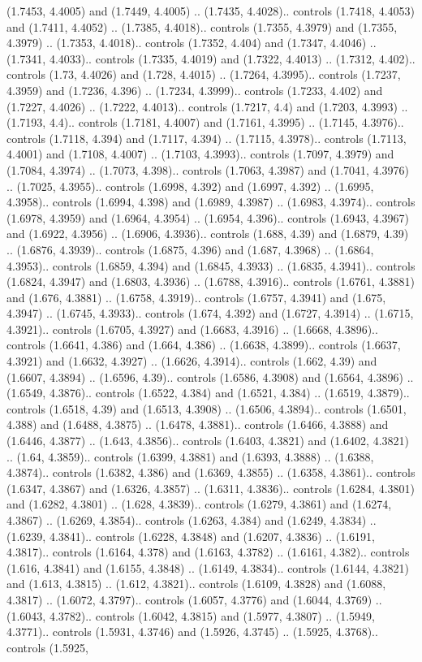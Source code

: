 (1.7453, 4.4005) and (1.7449, 4.4005) .. (1.7435, 4.4028).. controls (1.7418, 4.4053) and (1.7411, 4.4052) .. (1.7385, 4.4018).. controls (1.7355, 4.3979) and (1.7355, 4.3979) .. (1.7353, 4.4018).. controls (1.7352, 4.404) and (1.7347, 4.4046) .. (1.7341, 4.4033).. controls (1.7335, 4.4019) and (1.7322, 4.4013) .. (1.7312, 4.402).. controls (1.73, 4.4026) and (1.728, 4.4015) .. (1.7264, 4.3995).. controls (1.7237, 4.3959) and (1.7236, 4.396) .. (1.7234, 4.3999).. controls (1.7233, 4.402) and (1.7227, 4.4026) .. (1.7222, 4.4013).. controls (1.7217, 4.4) and (1.7203, 4.3993) .. (1.7193, 4.4).. controls (1.7181, 4.4007) and (1.7161, 4.3995) .. (1.7145, 4.3976).. controls (1.7118, 4.394) and (1.7117, 4.394) .. (1.7115, 4.3978).. controls (1.7113, 4.4001) and (1.7108, 4.4007) .. (1.7103, 4.3993).. controls (1.7097, 4.3979) and (1.7084, 4.3974) .. (1.7073, 4.398).. controls (1.7063, 4.3987) and (1.7041, 4.3976) .. (1.7025, 4.3955).. controls (1.6998, 4.392) and (1.6997, 4.392) .. (1.6995, 4.3958).. controls (1.6994, 4.398) and (1.6989, 4.3987) .. (1.6983, 4.3974).. controls (1.6978, 4.3959) and (1.6964, 4.3954) .. (1.6954, 4.396).. controls (1.6943, 4.3967) and (1.6922, 4.3956) .. (1.6906, 4.3936).. controls (1.688, 4.39) and (1.6879, 4.39) .. (1.6876, 4.3939).. controls (1.6875, 4.396) and (1.687, 4.3968) .. (1.6864, 4.3953).. controls (1.6859, 4.394) and (1.6845, 4.3933) .. (1.6835, 4.3941).. controls (1.6824, 4.3947) and (1.6803, 4.3936) .. (1.6788, 4.3916).. controls (1.6761, 4.3881) and (1.676, 4.3881) .. (1.6758, 4.3919).. controls (1.6757, 4.3941) and (1.675, 4.3947) .. (1.6745, 4.3933).. controls (1.674, 4.392) and (1.6727, 4.3914) .. (1.6715, 4.3921).. controls (1.6705, 4.3927) and (1.6683, 4.3916) .. (1.6668, 4.3896).. controls (1.6641, 4.386) and (1.664, 4.386) .. (1.6638, 4.3899).. controls (1.6637, 4.3921) and (1.6632, 4.3927) .. (1.6626, 4.3914).. controls (1.662, 4.39) and (1.6607, 4.3894) .. (1.6596, 4.39).. controls (1.6586, 4.3908) and (1.6564, 4.3896) .. (1.6549, 4.3876).. controls (1.6522, 4.384) and (1.6521, 4.384) .. (1.6519, 4.3879).. controls (1.6518, 4.39) and (1.6513, 4.3908) .. (1.6506, 4.3894).. controls (1.6501, 4.388) and (1.6488, 4.3875) .. (1.6478, 4.3881).. controls (1.6466, 4.3888) and (1.6446, 4.3877) .. (1.643, 4.3856).. controls (1.6403, 4.3821) and (1.6402, 4.3821) .. (1.64, 4.3859).. controls (1.6399, 4.3881) and (1.6393, 4.3888) .. (1.6388, 4.3874).. controls (1.6382, 4.386) and (1.6369, 4.3855) .. (1.6358, 4.3861).. controls (1.6347, 4.3867) and (1.6326, 4.3857) .. (1.6311, 4.3836).. controls (1.6284, 4.3801) and (1.6282, 4.3801) .. (1.628, 4.3839).. controls (1.6279, 4.3861) and (1.6274, 4.3867) .. (1.6269, 4.3854).. controls (1.6263, 4.384) and (1.6249, 4.3834) .. (1.6239, 4.3841).. controls (1.6228, 4.3848) and (1.6207, 4.3836) .. (1.6191, 4.3817).. controls (1.6164, 4.378) and (1.6163, 4.3782) .. (1.6161, 4.382).. controls (1.616, 4.3841) and (1.6155, 4.3848) .. (1.6149, 4.3834).. controls (1.6144, 4.3821) and (1.613, 4.3815) .. (1.612, 4.3821).. controls (1.6109, 4.3828) and (1.6088, 4.3817) .. (1.6072, 4.3797).. controls (1.6057, 4.3776) and (1.6044, 4.3769) .. (1.6043, 4.3782).. controls (1.6042, 4.3815) and (1.5977, 4.3807) .. (1.5949, 4.3771).. controls (1.5931, 4.3746) and (1.5926, 4.3745) .. (1.5925, 4.3768).. controls (1.5925, 